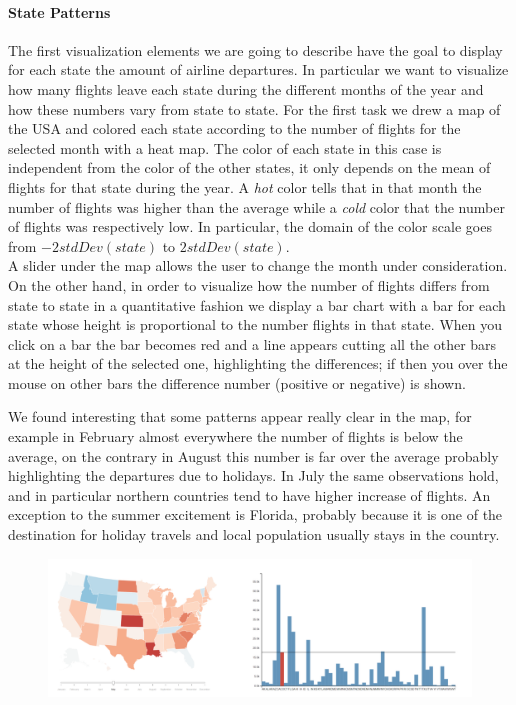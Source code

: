 \documentclass[a4paper, 12pt]{article}
\begin{document}
\paragraph*{State Patterns}
The first visualization elements we are going to describe have the goal to display for each state the 
amount of airline departures. In particular we want to visualize how many flights leave each state during
the different months of the year and how these numbers vary from state to state. For the first task we
drew a map of the USA and colored each state according to the number of flights for the selected month
with a heat map. The color of each state in this case is independent from the color of the other states,
it only depends on the mean of flights for that state during the year. A \emph{hot} color tells that in
that month the number of flights was higher than the average while a \emph{cold} color that the number of
flights was respectively low. In particular, the domain of the color scale goes from $-2stdDev(state)$ to $2stdDev(state)$.\\ A slider under the map allows the user to change the month under
consideration. On the other hand, in order to visualize how the number of flights differs from state to 
state in a quantitative fashion we display a bar chart with a bar for each state whose height is
proportional to the number flights in that state. When you click on a bar the bar becomes red and a line
appears cutting all the other bars at the height of the selected one, highlighting the differences; if 
then you over the mouse on other bars the difference number (positive or negative) is shown.


We found interesting that some patterns appear really clear in the map, for example in February almost
everywhere the number of flights is below the average, on the contrary in August this number is far over
the average probably highlighting the departures due to holidays. In July the same observations hold,
and in particular northern countries tend to have higher increase of flights. An exception to the summer 
excitement is Florida, probably because it is one of the destination for holiday travels and local
population usually stays in the country.\\
\begin{figure}[h]
\includegraphics[scale=0.7]{usamapbar.PNG}
\end{figure}
\\
\end{document}
